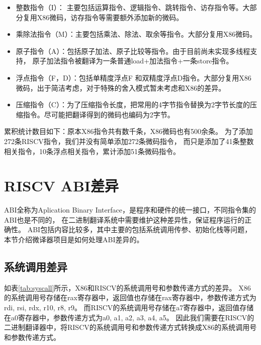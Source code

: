 \begin{itemize}
  \item 整数指令（I）： 主要包括运算指令、逻辑指令、跳转指令、访存指令等。大部分复用X86微码，访存指令等需要额外添加新的微码。

  \item 乘除法指令（M）：主要包括乘法、除法、取余等指令。大部分复用X86微码。

  \item 原子指令（A）：包括原子加法、原子比较等指令。由于目前尚未实现多线程支持，
  原子加法指令被翻译为一条普通load+加法指令+一条store指令。

  \item 浮点指令（F，D）：包括单精度浮点F 和双精度浮点D指令。大部分复用X86微码，出于简洁考虑，对于特殊的舍入模式暂未考虑和X86的差异。

  \item 压缩指令（C）：为了压缩指令长度，把常用的4字节指令替换为2字节长度的压缩指令。尽可能把翻译得到的微码也编码为2字节。

\end{itemize}

累积统计数目如下：原本X86指令共有数千条，X86微码也有500余条。
为了添加272条RISCV指令，我们并没有简单添加272条微码指令，
而只是添加了41条整数相关指令，10条浮点相关指令，累计添加51条微码指令。





\section{RISCV ABI差异}
ABI全称为Aplication Binary Interface，是程序和硬件的统一接口，不同指令集的ABI也是不同的，
在二进制翻译系统中需要维护这种差异性，保证程序运行的正确性。
ABI包括内容比较多，其中主要的包括系统调用传参、初始化栈等问题，本节介绍微译器项目是如何处理ABI差异的。


\subsection{系统调用差异}

如表\ref{tab:syscall}所示，X86和RISCV的系统调用号和参数传递方式的差异。
X86的系统调用号存储在rax寄存器中，返回值也存储在rax寄存器中，参数传递方式为rdi, rsi, rdx, r10, r8, r9。
而RISCV的系统调用号存储在a7寄存器中，返回值存储在a0寄存器中，参数传递方式为a0, a1, a2, a3, a4, a5。
因此我们需要在RISCV的二进制翻译器中，将RISCV的系统调用号和参数传递方式转换成X86的系统调用号和参数传递方式。

